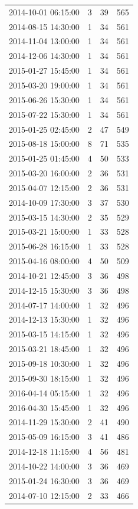 \begin{tabular}{lrrr}
2014-10-01 06:15:00 & 3 & 39 & 565 \\
2014-08-15 14:30:00 & 1 & 34 & 561 \\
2014-11-04 13:00:00 & 1 & 34 & 561 \\
2014-12-06 14:30:00 & 1 & 34 & 561 \\
2015-01-27 15:45:00 & 1 & 34 & 561 \\
2015-03-20 19:00:00 & 1 & 34 & 561 \\
2015-06-26 15:30:00 & 1 & 34 & 561 \\
2015-07-22 15:30:00 & 1 & 34 & 561 \\
2015-01-25 02:45:00 & 2 & 47 & 549 \\
2015-08-18 15:00:00 & 8 & 71 & 535 \\
2015-01-25 01:45:00 & 4 & 50 & 533 \\
2015-03-20 16:00:00 & 2 & 36 & 531 \\
2015-04-07 12:15:00 & 2 & 36 & 531 \\
2014-10-09 17:30:00 & 3 & 37 & 530 \\
2015-03-15 14:30:00 & 2 & 35 & 529 \\
2015-03-21 15:00:00 & 1 & 33 & 528 \\
2015-06-28 16:15:00 & 1 & 33 & 528 \\
2015-04-16 08:00:00 & 4 & 50 & 509 \\
2014-10-21 12:45:00 & 3 & 36 & 498 \\
2014-12-15 15:30:00 & 3 & 36 & 498 \\
2014-07-17 14:00:00 & 1 & 32 & 496 \\
2014-12-13 15:30:00 & 1 & 32 & 496 \\
2015-03-15 14:15:00 & 1 & 32 & 496 \\
2015-03-21 18:45:00 & 1 & 32 & 496 \\
2015-09-18 10:30:00 & 1 & 32 & 496 \\
2015-09-30 18:15:00 & 1 & 32 & 496 \\
2016-04-14 05:15:00 & 1 & 32 & 496 \\
2016-04-30 15:45:00 & 1 & 32 & 496 \\
2014-11-29 15:30:00 & 2 & 41 & 490 \\
2015-05-09 16:15:00 & 3 & 41 & 486 \\
2014-12-18 11:15:00 & 4 & 56 & 481 \\
2014-10-22 14:00:00 & 3 & 36 & 469 \\
2015-01-24 16:30:00 & 3 & 36 & 469 \\
2014-07-10 12:15:00 & 2 & 33 & 466 \\

\end{tabular}
